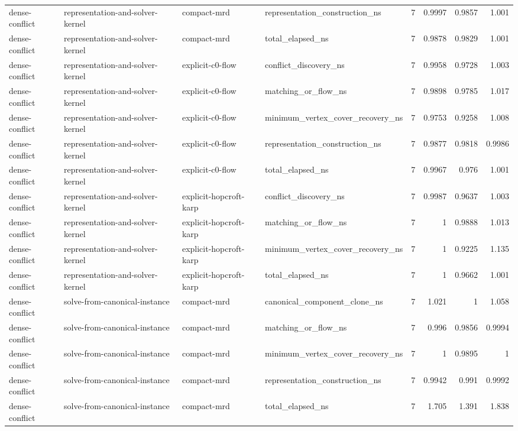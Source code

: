 \begin{table}[t]
\begin{tabular}{llllrrrr}
dense-conflict & representation-and-solver-kernel & compact-mrd & representation\_construction\_ns & 7 & 0.9997 & 0.9857 & 1.001 \\
dense-conflict & representation-and-solver-kernel & compact-mrd & total\_elapsed\_ns & 7 & 0.9878 & 0.9829 & 1.001 \\
dense-conflict & representation-and-solver-kernel & explicit-c0-flow & conflict\_discovery\_ns & 7 & 0.9958 & 0.9728 & 1.003 \\
dense-conflict & representation-and-solver-kernel & explicit-c0-flow & matching\_or\_flow\_ns & 7 & 0.9898 & 0.9785 & 1.017 \\
dense-conflict & representation-and-solver-kernel & explicit-c0-flow & minimum\_vertex\_cover\_recovery\_ns & 7 & 0.9753 & 0.9258 & 1.008 \\
dense-conflict & representation-and-solver-kernel & explicit-c0-flow & representation\_construction\_ns & 7 & 0.9877 & 0.9818 & 0.9986 \\
dense-conflict & representation-and-solver-kernel & explicit-c0-flow & total\_elapsed\_ns & 7 & 0.9967 & 0.976 & 1.001 \\
dense-conflict & representation-and-solver-kernel & explicit-hopcroft-karp & conflict\_discovery\_ns & 7 & 0.9987 & 0.9637 & 1.003 \\
dense-conflict & representation-and-solver-kernel & explicit-hopcroft-karp & matching\_or\_flow\_ns & 7 & 1 & 0.9888 & 1.013 \\
dense-conflict & representation-and-solver-kernel & explicit-hopcroft-karp & minimum\_vertex\_cover\_recovery\_ns & 7 & 1 & 0.9225 & 1.135 \\
dense-conflict & representation-and-solver-kernel & explicit-hopcroft-karp & total\_elapsed\_ns & 7 & 1 & 0.9662 & 1.001 \\
dense-conflict & solve-from-canonical-instance & compact-mrd & canonical\_component\_clone\_ns & 7 & 1.021 & 1 & 1.058 \\
dense-conflict & solve-from-canonical-instance & compact-mrd & matching\_or\_flow\_ns & 7 & 0.996 & 0.9856 & 0.9994 \\
dense-conflict & solve-from-canonical-instance & compact-mrd & minimum\_vertex\_cover\_recovery\_ns & 7 & 1 & 0.9895 & 1 \\
dense-conflict & solve-from-canonical-instance & compact-mrd & representation\_construction\_ns & 7 & 0.9942 & 0.991 & 0.9992 \\
dense-conflict & solve-from-canonical-instance & compact-mrd & total\_elapsed\_ns & 7 & 1.705 & 1.391 & 1.838 \\

\end{tabular}
\end{table}
